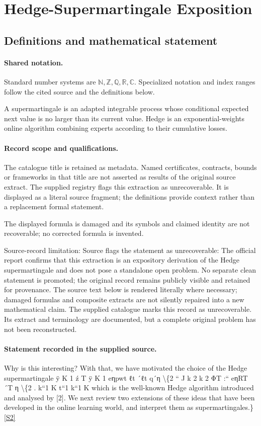 \documentclass[11pt]{article}
\newcommand{\sref}[2]{\hyperlink{source:#1:#2}{[S#2]}}
\begin{document}
\section{Hedge-Supermartingale Exposition}\label{statement}

\subsection{Definitions and mathematical statement}

\paragraph{Shared notation.}Standard number systems are $\mathbb N,\mathbb Z,\mathbb Q,\mathbb R,\mathbb C$. Specialized notation and index ranges follow the cited source and the definitions below.


A supermartingale is an adapted integrable process whose conditional expected next value is no larger than its current value. Hedge is an exponential-weights online algorithm combining experts according to their cumulative losses.
\paragraph{Record scope and qualifications.}
The catalogue title is retained as metadata. Named certificates, contracts, bounds or frameworks in that title are not asserted as results of the original source extract.
The supplied registry flags this extraction as unrecoverable. It is displayed as a literal source fragment; the definitions provide context rather than a replacement formal statement.

The displayed formula is damaged and its symbols and claimed identity are not recoverable; no corrected formula is invented.

Source-record limitation: Source flags the statement as unrecoverable: The official report confirms that this extraction is an expository derivation of the Hedge supermartingale and does not pose a standalone open problem. No separate clean statement is promoted; the original record remains publicly visible and retained for provenance.
The source text below is rendered literally where necessary; damaged formulas and composite extracts are not silently repaired into a new mathematical claim.
The supplied catalogue marks this record as unrecoverable. Its extract and terminology are documented, but a complete original problem has not been reconstructed.
\paragraph{Statement recorded in the supplied source.}
Why is this interesting? With that, we have motivated the choice of the Hedge supermartingale ÿ K 1 ź T ÿ K 1 eηpwt ℓt ´ℓt q´η \textbackslash{}\{2 “ J k 2 k 2 ΦT :“ eηRT ´T η \textbackslash{}\{2 . k“1 K t“1 k“1 K which is the well-known Hedge algorithm introduced and analysed by [2]. We next review two extensions of these ideas that have been developed in the online learning world, and interpret them as supermartingales.\} \sref{statement}{2}
\end{document}
